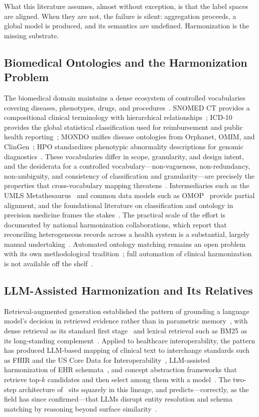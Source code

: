 \documentclass[conference]{IEEEtran}
\begin{document}
What this literature assumes, almost without exception, is that the label spaces are aligned. When they are not, the failure is silent: aggregation proceeds, a global model is produced, and its semantics are undefined. Harmonization is the missing substrate.

\subsection{Biomedical Ontologies and the Harmonization Problem}

The biomedical domain maintains a dense ecosystem of controlled vocabularies covering diseases, phenotypes, drugs, and procedures~\cite{b7,b8,b9,b10}. SNOMED CT provides a compositional clinical terminology with hierarchical relationships~\cite{b7}; ICD-10 provides the global statistical classification used for reimbursement and public health reporting~\cite{b8}; MONDO unifies disease ontologies from Orphanet, OMIM, and ClinGen~\cite{b9}; HPO standardizes phenotypic abnormality descriptions for genomic diagnostics~\cite{b10}. These vocabularies differ in scope, granularity, and design intent, and the desiderata for a controlled vocabulary---non-vagueness, non-redundancy, non-ambiguity, and consistency of classification and granularity---are precisely the properties that cross-vocabulary mapping threatens~\cite{b11}. Intermediaries such as the UMLS Metathesaurus~\cite{b12} and common data models such as OMOP~\cite{b13} provide partial alignment, and the foundational literature on classification and ontology in precision medicine frames the stakes~\cite{b14}. The practical scale of the effort is documented by national harmonization collaborations, which report that reconciling heterogeneous records across a health system is a substantial, largely manual undertaking~\cite{b49}. Automated ontology matching remains an open problem with its own methodological tradition~\cite{b29}; full automation of clinical harmonization is not available off the shelf~\cite{b1}.

\subsection{LLM-Assisted Harmonization and Its Relatives}

Retrieval-augmented generation established the pattern of grounding a language model's decision in retrieved evidence rather than in parametric memory~\cite{b15}, with dense retrieval as its standard first stage~\cite{b16} and lexical retrieval such as BM25 as its long-standing complement~\cite{b17}. Applied to healthcare interoperability, the pattern has produced LLM-based mapping of clinical text to interchange standards such as FHIR and the US Core Data for Interoperability~\cite{b41,b46,b62}, LLM-assisted harmonization of EHR schemata~\cite{b39}, and concept abstraction frameworks that retrieve top-$k$ candidates and then select among them with a model~\cite{b40}. The two-step architecture of~\cite{b1} sits squarely in this lineage, and predicts---correctly, as the field has since confirmed---that LLMs disrupt entity resolution and schema matching by reasoning beyond surface similarity~\cite{b38}.
\end{document}

